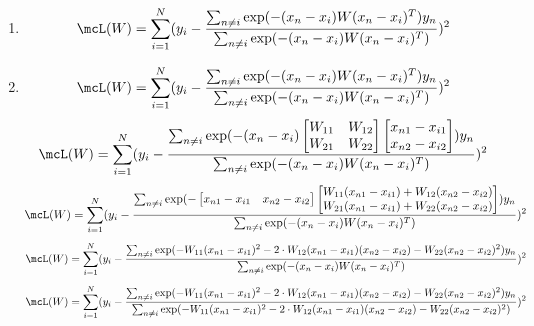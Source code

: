 \documentclass[submit]{harvardml}
\begin{document}
\begin{enumerate}
    \item 
    \begin{equation*}
    \mcL(W) = \sum_{i = 1}^{N} (y_i - \frac{ \sum_{n\neq i} \exp(-(x_n-x_i) W (x_n-x_i)^T ) y_n  }{ \sum_{n\neq i} \exp(-(x_n-x_i) W (x_n-x_i)^T ) })^2
  \end{equation*}
  
  \bigskip
  \item
  \begin{equation*}
    \mcL(W) = \sum_{i = 1}^{N} (y_i - \frac{ \sum_{n\neq i} \exp(-(x_n-x_i) W (x_n-x_i)^T ) y_n  }{ \sum_{n\neq i} \exp(-(x_n-x_i) W (x_n-x_i)^T ) })^2
  \end{equation*}
  \begin{equation*}
    \mcL(W) = \sum_{i = 1}^{N} (y_i - \frac{ \sum_{n\neq i} \exp(-(x_n-x_i) 
    \begin{bmatrix}
    W_{11} & W_{12}\\
    W_{21} & W_{22}
    \end{bmatrix} 
    \begin{bmatrix}
    x_{n1} - x_{i1}\\
    x_{n2} - x_{i2}
    \end{bmatrix} ) y_n  }{ \sum_{n\neq i} \exp(-(x_n-x_i) W (x_n-x_i)^T ) })^2
  \end{equation*}
    \begin{equation*}
    \mcL(W) = \sum_{i = 1}^{N} (y_i - \frac{ \sum_{n\neq
    i} \exp(-
    \begin{bmatrix}
    x_{n1} - x_{i1} & x_{n2} - x_{i2}
    \end{bmatrix}
    \begin{bmatrix}
    W_{11}(x_{n1} - x_{i1}) + W_{12}(x_{n2} - x_{i2})\\
    W_{21}(x_{n1} - x_{i1}) + W_{22}(x_{n2} - x_{i2})
    \end{bmatrix} ) y_n  }{ \sum_{n\neq i} \exp(-(x_n-x_i)
    W (x_n-x_i)^T ) })^2
  \end{equation*}
  \begin{equation*}
    \mcL(W) = \sum_{i = 1}^{N} (y_i - \frac{ \sum_{n\neq
    i} \exp(-W_{11}(x_{n1} - x_{i1})^2 - 2 \cdot
    W_{12}(x_{n1} - x_{i1})(x_{n2} - x_{i2}) -
    W_{22}(x_{n2} - x_{i2})^2) y_n  }{ \sum_{n\neq i}
    \exp(-(x_n-x_i) W (x_n-x_i)^T ) })^2 
    \end{equation*}
  \begin{equation*}
    \mcL(W) = \sum_{i = 1}^{N} (y_i - \frac{ \sum_{n\neq
    i} \exp(-W_{11}(x_{n1} - x_{i1})^2 - 2 \cdot
    W_{12}(x_{n1} - x_{i1})(x_{n2} - x_{i2}) -
    W_{22}(x_{n2} - x_{i2})^2) y_n  }{ \sum_{n\neq i}
    \exp(-W_{11}(x_{n1} - x_{i1})^2 - 2 \cdot
    W_{12}(x_{n1} - x_{i1})(x_{n2} - x_{i2}) -
    W_{22}(x_{n2} - x_{i2})^2) })^2 
    \end{equation*}
    

\end{enumerate}
\end{document}

